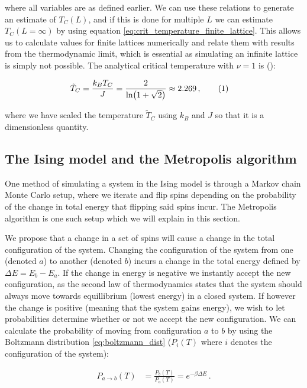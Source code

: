 \documentclass[reprint,english,notitlepage]{revtex4-1}  %
\newcommand\numberthis{\addtocounter{equation}{1}\tag{\theequation}}
\begin{document}
where all variables are as defined earlier. We can use these relations to generate an estimate of $T_C(L)$, and if this is done for multiple $L$ we can estimate $T_C(L=\infty)$ by using equation \eqref{eq:crit_temperature_finite_lattice}. This allows us to calculate values for finite lattices numerically and relate them with results from the thermodynamic limit, which is essential as simulating an infinite lattice is simply not possible. The analytical critical temperature with $\nu=1$ is (\citep{L.Onsager1944}):

\begin{align*}
\tilde{T}_C &= \frac{k_B T_C}{J} = \frac{2}{\ln(1 + \sqrt{2})} \approx 2.269 \, , \numberthis \label{eq:crit_temperature_analytical}
\end{align*}

where we have scaled the temperature $\tilde{T}_C$ using $k_B$ and $J$ so that it is a dimensionless quantity. 


\subsection{The Ising model and the Metropolis algorithm} \label{sec:II:b}

One method of simulating a system in the Ising model is through a Markov chain Monte Carlo setup, where we iterate and flip spins depending on the probability of the change in total energy that flipping said spins incur. The Metropolis algorithm \citep{Metropolis} is one such setup which we will explain in this section.

We propose that a change in a set of spins will cause a change in the total configuration of the system. Changing the configuration of the system from one (denoted $a$) to another (denoted $b$) incurs a change in the total energy defined by $\Delta E = E_b - E_a$. If the change in energy is negative we instantly accept the new configuration, as the second law of thermodynamics states that the system should always move towards equillibrium (lowest energy) in a closed system. If however the change is positive (meaning that the system gains energy), we wish to let probabilities determine whether or not we accept the new configuration. We can calculate the probability of moving from configuration $a$ to $b$ by using the Boltzmann distribution \eqref{eq:boltzmann_dist} ($P_i(T)$ where $i$ denotes the configuration of the system):

\begin{align*}
P_{a\to b}(T)  &= \frac{P_b (T) }{P_a (T)} = e^{-\beta \Delta E }\, . 
\end{align*}
\end{document}
